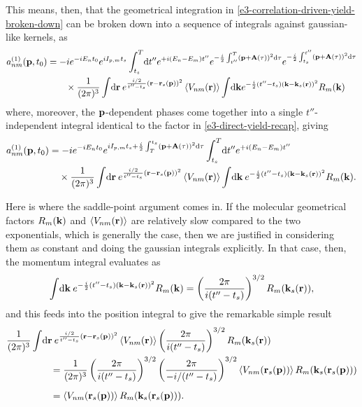 This means, then, that the geometrical integration in \eqref{e3-correlation-driven-yield-broken-down} can be broken down into a sequence of integrals against gaussian-like kernels, as
\begin{align}
a_{nm}^{(1)}(\vb{p},{t_0})
& =
-i
e^{-iE_n {t_0}}
e^{iI_{p,m} {t_s}}
\int_{{t_s}}^T\!\mathrm{d} t''
e^{+i(E_n-E_m)t''}
e^{-\frac{i}{2} \int_{t''}^T\left(\vb{p}+\vb{A}(\tau)\right)^2\mathrm{d}\tau} 
e^{-\frac i2 \int_{{t_s}}^{t''} (\vb{p}+\vb{A}(\tau))^2 \mathrm{d}\tau}
\nonumber \\ & \quad \quad  \times
\frac{1}{(2\pi)^{3}}
\int\!\mathrm{d}\vb{r} \:
e^{\frac{i/2}{t''-{t_s}} (\vb{r}-\vb{r}_s(\vb{p}))^2}
\left\langle V_{nm}\mathopen{}\left( \vb{r} \right)\mathclose{} \right\rangle
\int\!\mathrm{d}\vb{k}
e^{-\frac i2 (t''-{t_s}) (\vb{k}-\vb{k}_s(\vb{r}))^2}
R_m(\vb{k})
\label{e3-correlation-driven-yield-with-completed-squares}
\end{align}
where, moreover, the $\vb{p}$-dependent phases come together into a single $t''$-independent integral identical to the factor in \eqref{e3-direct-yield-recap}, giving
\begin{align}
a_{nm}^{(1)}(\vb{p},{t_0})
& =
-i
e^{-iE_n {t_0}}
e^{iI_{p,m} {t_s}+\frac{i}{2} \int_T^{{t_s}}\left(\vb{p}+\vb{A}(\tau)\right)^2\mathrm{d}\tau} 
\int_{{t_s}}^T\!\mathrm{d} t''
e^{+i(E_n-E_m)t''}
\nonumber \\ & \quad \times
\frac{1}{(2\pi)^{3}}
\int\!\mathrm{d}\vb{r} \:
e^{\frac{i/2}{t''-{t_s}} (\vb{r}-\vb{r}_s(\vb{p}))^2}
\left\langle V_{nm}\mathopen{}\left( \vb{r} \right)\mathclose{} \right\rangle
\int\!\mathrm{d}\vb{k}  \:
e^{-\frac i2 (t''-{t_s}) (\vb{k}-\vb{k}_s(\vb{r}))^2}
R_m(\vb{k})
.
\label{e3-correlation-driven-yield-with-completed-squares-2}
\end{align}


Here is where the saddle-point argument comes in. If the molecular geometrical factors $R_m(\vb{k})$ and $\left\langle V_{nm}\mathopen{}\left( \vb{r} \right)\mathclose{} \right\rangle$ are relatively slow compared to the two exponentials, which is generally the case, then we are justified in considering them as constant and doing the gaussian integrals explicitly. In that case, then, the momentum integral evaluates as
\begin{equation}
\int\!\mathrm{d}\vb{k}  \:
e^{-\frac i2 (t''-{t_s}) (\vb{k}-\vb{k}_s(\vb{r}))^2}
R_m(\vb{k})
=
\left(
 \frac{2\pi}{i(t''-{t_s})}
 \right)^{3/2}
R_m(\vb{k}_s(\vb{r}))
,
\label{e3-geometric-integral-after-k-spa}
\end{equation}
and this feeds into the position integral to give the remarkable simple result
\begin{align}
\frac{1}{(2\pi)^{3}}
&
\int\!\d\vbr \:
e^{\frac{i/2}{t''-\ts} (\vbr-\vbr_s(\vbp))^2}
\Vnm{\vbr}
\left(
 \frac{2\pi}{i(t''-\ts)}
 \right)^{3/2}
R_m(\vbk_s(\vbr))
%
\nonumber \\ & \qquad =
%
\frac{1}{(2\pi)^{3}}
\left(
 \frac{2\pi}{i(t''-\ts)}
 \right)^{3/2}
\left(
 \frac{2\pi}{-i/(t''-\ts)}
 \right)^{3/2}
\Vnm{\vbr_s(\vbp)}
R_m(\vbk_s(\vbr_s(\vbp)))
%
\nonumber \\[5pt] & \qquad =
%
\Vnm{\vbr_s(\vbp)}
R_m(\vbk_s(\vbr_s(\vbp)))
.
\label{e3-geometrical-saddle-point-simplified}
\end{align}


